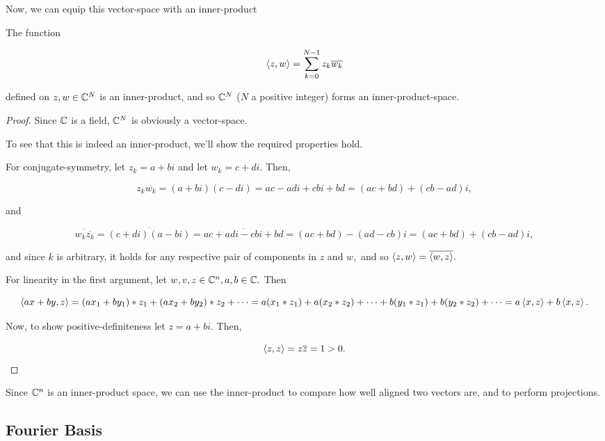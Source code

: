 \documentclass{article}
\begin{document}
Now, we can equip this \@{vector-space} with an \@{inner-product}

\begin{theorem}\label{complex-inner-product-space}
The \@{function}

\[ \left\langle z, w \right\rangle = \sum_{k=0}^{N-1} z_k \overline{w_k} \]

defined on $z, w \in \mathbb{C}^N$ is an \@{inner-product}, and so $\mathbb{C}^N$ ($N$ a positive integer) forms an \@{inner-product-space}.
\end{theorem}

\begin{proof}
Since $\mathbb{C}$ is a \@{field}, $\mathbb{C}^N$ is obviously a \@{vector-space}.

To see that this is indeed an \@{inner-product}, we'll show the required properties hold.

For \@{conjugate-symmetry}, let $z_k = a + bi$ and let $w_k = c + di.$ Then,

\[ z_k \overline{w_k} = (a + bi)(c - di) = ac - adi + cbi + bd = (ac + bd) + (cb - ad)i, \]

and

\[ \overline{w_k \overline{z_k}} = \overline{(c + di)(a - bi)} = \overline{ac + adi - cbi + bd} = (ac + bd) - (ad - cb)i = (ac + bd) + (cb - ad)i, \]

and since $k$ is arbitrary, it holds for any respective pair of components in $z$ and $w,$ and so $\left\langle z, w \right\rangle = \overline{\left\langle w, z \right\rangle}.$

For \@{linearity} in the first argument, let $w, v, z \in \mathbb{C}^n, a, b \in \mathbb{C}.$ Then

\[ \left\langle ax + by, z \right\rangle = (a x_1 + b y_1) * z_1 + (a x_2 + b y_2) * z_2 + \cdots = a(x_1 * z_1) + a(x_2 * z_2) + \cdots + b(y_1 * z_1) + b(y_2 * z_2) + \cdots = a \left\langle x, z \right\rangle + b \left\langle x, z \right\rangle. \]

Now, to show \@{positive-definiteness} let $z = a + bi.$ Then,

\[ \left\langle z, z \right\rangle = z \overline{z} = 1 > 0. \]
\end{proof}

\detach

\begin{remark}
Since $\mathbb{C}^n$ is an inner-product space, we can use the \@{inner-product} to compare how well aligned two vectors are, and to perform projections.
\end{remark}

\subsection{Fourier Basis}
\end{document}

